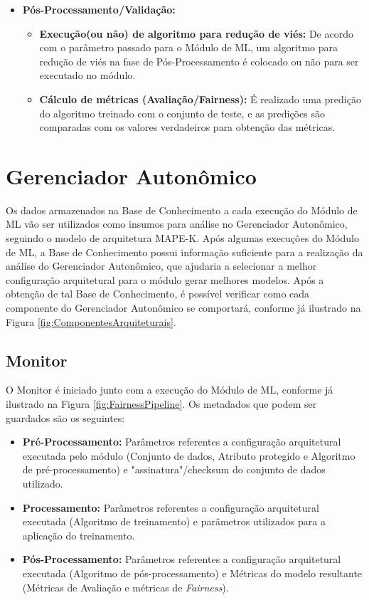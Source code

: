 \documentclass[portugues]{ic-tese}
\begin{document}
\begin{itemize}
\begin{itemize}
	\end{itemize}
\item \textbf{Pós-Processamento/Validação:}
	\begin{itemize}
	\item \textbf{Execução(ou não) de algoritmo para redução de viés:} De acordo com o parâmetro passado para o Módulo de ML, um algoritmo para redução de viés na fase de Pós-Processamento é colocado ou não para ser executado no módulo.
	\item \textbf{Cálculo de métricas (Avaliação/Fairness):} É realizado uma predição do algoritmo treinado com o conjunto de teste, e as predições são comparadas com os valores verdadeiros para obtenção das métricas.
	\end{itemize}
\end{itemize}

\section{Gerenciador Autonômico}
\label{sec:GerenciadorAutonomico}

Os dados armazenados na Base de Conhecimento a cada execução do Módulo de ML vão ser utilizados como insumos para análise no Gerenciador Autonômico, seguindo o modelo de arquitetura MAPE-K. Após algumas execuções do Módulo de ML, a Base de Conhecimento possui informação suficiente para a realização da análise do Gerenciador Autonômico, que ajudaria a selecionar a melhor configuração arquitetural para o módulo gerar melhores modelos. Após a obtenção de tal Base de Conhecimento, é possível verificar como cada componente do Gerenciador Autonômico se comportará, conforme já ilustrado na Figura \ref{fig:ComponentesArquiteturais}.

\subsection{Monitor}

O Monitor é iniciado junto com a execução do Módulo de ML, conforme já ilustrado na Figura \ref{fig:FairnessPipeline}. Os metadados que podem ser guardados são os seguintes:

\begin{itemize}
\item \textbf{Pré-Processamento:} Parâmetros referentes a configuração arquitetural executada pelo módulo (Conjunto de dados, Atributo protegido e Algoritmo de pré-processamento) e "assinatura"/checksum do conjunto de dados utilizado.
\item \textbf{Processamento:} Parâmetros referentes a configuração arquitetural executada (Algoritmo de treinamento) e parâmetros utilizados para a aplicação do treinamento.
\item \textbf{Pós-Processamento:} Parâmetros referentes a configuração arquitetural executada (Algoritmo de pós-processamento) e Métricas do modelo resultante (Métricas de Avaliação e métricas de \textit{Fairness}).
\end{itemize}
\end{document}
